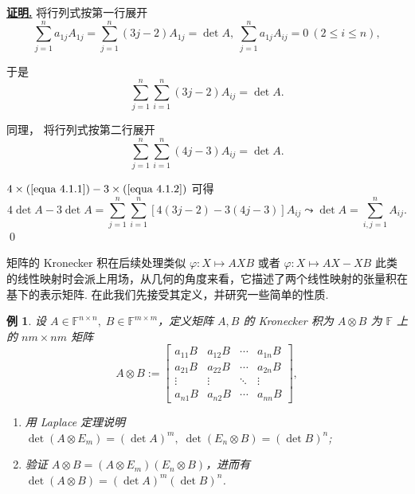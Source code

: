 \documentclass[10pt,openany]{article}
\theoremstyle{thmstyle} %
\theoremstyle{defstyle} %
\theoremstyle{prostyle} %
\theoremstyle{exastyle}
\newtheorem{example}[theorem]{例}
\theoremstyle{remstyle}
\renewenvironment{proof}[1][证明]{\par\underline{\textbf{#1.}} \;\fangsong}{\qed\par}
\newcommand{\F}{\mathbb{F}}
\newcommand{\n}{^{n \times n}}
\begin{document}
\begin{proof}
	将行列式按第一行展开
	\[ \sum_{j=1}^{n} a_{1j}A_{1j}= \sum_{j=1}^{n} (3j-2)A_{1j}= \det A, \; \sum_{j=1}^{n} a_{1j}A_{ij}=0 \ (2 \leq i \leq n), \]
	
	于是
	\begin{equation}
		\sum_{j=1}^{n}\sum_{i=1}^{n} (3j-2) A_{ij}=\det A. 
		\label{equa 4.1.1}
	\end{equation}
	
	同理，	将行列式按第二行展开
	\begin{equation}
	    \sum_{j=1}^{n}\sum_{i=1}^{n} (4j-3) A_{ij}=\det A.
	    \label{equa 4.1.2}
	\end{equation}
	
	\( 4 \times (\ref{equa 4.1.1})-3 \times (\ref{equa 4.1.2}) \) 可得
	\[ 4\det A-3\det A=\sum_{j=1}^{n}\sum_{i=1}^{n} [4(3j-2)-3(4j-3)] A_{ij} \leadsto \det A= \sum_{i,j=1}^{n} A_{ij}. \]
\end{proof}

矩阵的 Kronecker 积在后续处理类似 \( \varphi: X \mapsto AXB \) 或者 \( \varphi: X \mapsto AX-XB \) 此类的线性映射时会派上用场，从几何的角度来看，它描述了两个线性映射的张量积在基下的表示矩阵. 在此我们先接受其定义，并研究一些简单的性质.

\begin{example}
	设 \( A \in \F\n, \; B \in \F^{m \times m} \)，定义矩阵 \( A,B \) 的 Kronecker 积为 \( A \otimes B \) 为 \( \F \) 上的 \( nm \times nm \) 矩阵
	\[ A \otimes B := \begin{bmatrix}
		a_{11}B & a_{12}B & \cdots & a_{1n}B \\
		a_{21}B & a_{22}B & \cdots & a_{2n}B \\
		\vdots & \vdots & \ddots & \vdots \\
		a_{n1}B & a_{n2}B & \cdots & a_{nn}B
	\end{bmatrix}, \]
	
	\begin{enumerate}[(1)]
		\item 用 Laplace 定理说明 \( \det (A \otimes E_m)= (\det A)^m, \; \det (E_n \otimes B)=(\det B)^n \);
		\item 验证 \( A \otimes B=(A \otimes E_m)(E_n \otimes B) \)，进而有 \( \det (A \otimes B)= (\det A)^m (\det B)^n \).
	\end{enumerate}
	
\end{example}
\end{document}
